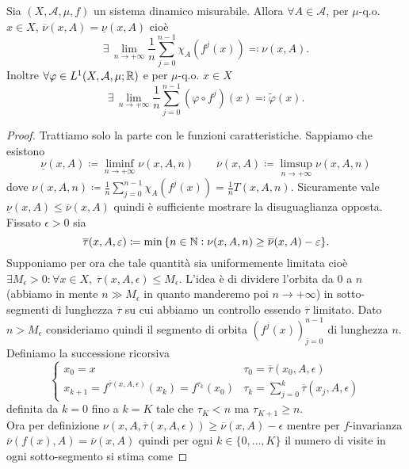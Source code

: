 \begin{thm}[Birkhoff] \label{thm:Birkoff}
    Sia $ (X, \mathcal{A}, \mu, f) $ un sistema dinamico misurabile. Allora $ \forall A \in \mathcal{A} $, per $ \mu $-q.o. $ x \in X $, $ \overline{\nu}(x, A) = \underline{\nu}(x, A) $ cioè
    \[
        \exists \, \lim_{n \to +\infty} \frac{1}{n} \sum_{j = 0}^{n-1} \chi_A(f^{j}(x)) \eqqcolon \nu(x, A).
    \]
    Inoltre $ \forall \varphi \in L^1(X, \mathcal{A}, \mu; \mathbb{R}) $ e per $ \mu $-q.o. $ x \in X $
    \[
        \exists \, \lim_{n \to +\infty} \frac{1}{n} \sum_{j=0}^{n-1} (\varphi \circ f^j)(x) \eqqcolon \tilde{\varphi}(x).
    \]
\end{thm}
\begin{proof}
    Trattiamo solo la parte con le funzioni caratteristiche. Sappiamo che esistono
    \[
        \underline{\nu}(x, A) \coloneqq \liminf_{n \to +\infty} \nu(x, A, n) \qquad \overline{\nu}(x, A) \coloneqq \limsup_{n \to +\infty} \nu(x, A, n)
    \]
    dove $ \nu(x, A, n) \coloneqq \frac{1}{n} \sum_{j = 0}^{n-1} \chi_A(f^{j}(x)) = \frac{1}{n} T(x, A, n) $. Sicuramente vale $ \underline{\nu}(x, A) \leq \overline{\nu}(x, A) $ quindi è sufficiente mostrare la disuguaglianza opposta. \\
    Fissato $ \epsilon > 0 $ sia
    \[
        \overline{\tau}(x, A, \varepsilon) \coloneqq \min{\{n \in \mathbb{N}: \nu(x, A, n) \geq \overline{\nu}(x, A) - \varepsilon\}}.
    \]
    Supponiamo per ora che tale quantità sia uniformemente limitata cioè $ \exists M_\epsilon > 0 : \forall x \in X, \ \overline{\tau}(x, A, \epsilon) \leq M_\epsilon $. L'idea è di dividere l'orbita da 0 a $ n $ (abbiamo in mente $ n \gg M_\epsilon $ in quanto manderemo poi $ n \to +\infty $) in sotto-segmenti di lunghezza $ \overline{\tau} $ su cui abbiamo un controllo essendo $ \overline{\tau} $ limitato. Dato $ n > M_\epsilon $ consideriamo quindi il segmento di orbita $ (f^{j}(x))_{j = 0}^{n-1} $ di lunghezza $ n $. Definiamo la successione ricorsiva
    \[
        \begin{cases}
        x_0 = x & \tau_0 = \overline{\tau}(x_0, A, \epsilon) \\
        x_{k+1} = f^{\overline{\tau}(x, A, \epsilon)}(x_k) = f^{\tau_k}(x_0) & \tau_k = \sum_{j = 0}^{k} \overline{\tau}(x_j, A, \epsilon)
        \end{cases}
    \]
    definita da $ k = 0 $ fino a $ k = K $ tale che $ \tau_{K} < n $ ma $ \tau_{K+1} \geq n $. \\
    Ora per definizione $ \nu(x, A, \overline{\tau}(x, A , \epsilon)) \geq \overline{\nu}(x, A) - \epsilon $ mentre per $ f $-invarianza $ \overline{\nu}(f(x), A) = \overline{\nu}(x, A) $ quindi per ogni $ k \in \{0, \ldots, K\} $ il numero di visite in ogni sotto-segmento si stima come

\end{proof}
